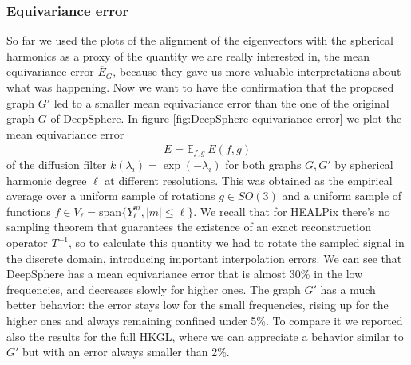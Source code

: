 \subsubsection{Equivariance error}
So far we used the plots of the alignment of the eigenvectors with the spherical harmonics as a proxy of the quantity we are really interested in, the mean equivariance error $\overline E_G$, because they gave us more valuable interpretations about what was happening. Now we want to have the confirmation that the proposed graph $G'$ led to a smaller mean equivariance error than the one of the original graph $G$ of DeepSphere.
In figure \ref{fig:DeepSphere equivariance error} we plot the mean equivariance error 
$$\overline E = \mathbb E_{f, g}\ E(f, g)
$$ of the diffusion filter $k(\lambda_i) = \exp(-\lambda_i)$ for both graphs $G, G'$ by spherical harmonic degree $\ell$ at different resolutions. This was obtained as the empirical average over a uniform sample of rotations $g\in SO(3)$ and a uniform sample of functions $f\in V_\ell = \text{span}\{Y_\ell^m, |m|\leq \ell\}$. We recall that for HEALPix there's no sampling theorem that guarantees the existence of an exact reconstruction operator $T^{-1}$, so to calculate this quantity we had to rotate the sampled signal in the discrete domain, introducing important interpolation errors. We can see that DeepSphere has a mean equivariance error that is almost 30\% in the low frequencies, and decreases slowly for higher ones. The graph $G'$ has a much better behavior: the error stays low for the small frequencies, rising up for the higher ones and always remaining confined under 5\%. To compare it we reported also the results for the full HKGL, where we can appreciate a behavior similar to $G'$ but with an error always smaller than 2\%.


